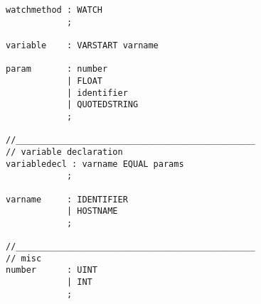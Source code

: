 \begin{verbatim}
watchmethod : WATCH            	
            ;

variable    : VARSTART varname	

param       : number            
            | FLOAT            	
            | identifier		
            | QUOTEDSTRING		
            ;

//_______________________________________________
// variable declaration
variabledecl : varname EQUAL params	
            ;

varname	    : IDENTIFIER            
            | HOSTNAME            	
            ;

//_______________________________________________
// misc
number      : UINT            		
            | INT            		
            ;
\end{verbatim}
